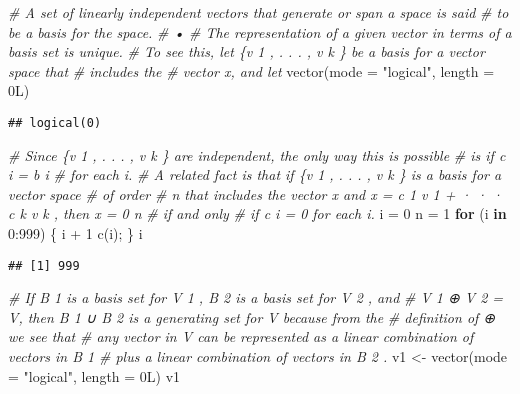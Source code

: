 \documentclass[
]{article}
\newenvironment{Shaded}{\begin{snugshade}}{\end{snugshade}}
\newcommand{\AttributeTok}[1]{\textcolor[rgb]{0.77,0.63,0.00}{#1}}
\newcommand{\CommentTok}[1]{\textcolor[rgb]{0.56,0.35,0.01}{\textit{#1}}}
\newcommand{\ControlFlowTok}[1]{\textcolor[rgb]{0.13,0.29,0.53}{\textbf{#1}}}
\newcommand{\DecValTok}[1]{\textcolor[rgb]{0.00,0.00,0.81}{#1}}
\newcommand{\FunctionTok}[1]{\textcolor[rgb]{0.00,0.00,0.00}{#1}}
\newcommand{\NormalTok}[1]{#1}
\newcommand{\OtherTok}[1]{\textcolor[rgb]{0.56,0.35,0.01}{#1}}
\newcommand{\SpecialCharTok}[1]{\textcolor[rgb]{0.00,0.00,0.00}{#1}}
\newcommand{\StringTok}[1]{\textcolor[rgb]{0.31,0.60,0.02}{#1}}
\begin{document}
\begin{Shaded}
\begin{Highlighting}[]
\CommentTok{\# A set of linearly independent vectors that generate or span a space is said}
\CommentTok{\# to be a basis for the space.}
\CommentTok{\# •}
\CommentTok{\# The representation of a given vector in terms of a basis set is unique.}
\CommentTok{\# To see this, let \{v 1 , . . . , v k \} be a basis for a vector space that }
\CommentTok{\# includes the}
\CommentTok{\# vector x, and let}
\FunctionTok{vector}\NormalTok{(}\AttributeTok{mode =} \StringTok{"logical"}\NormalTok{, }\AttributeTok{length =}\NormalTok{ 0L)}
\end{Highlighting}
\end{Shaded}

\begin{verbatim}
## logical(0)
\end{verbatim}

\begin{Shaded}
\begin{Highlighting}[]
\CommentTok{\# Since \{v 1 , . . . , v k \} are independent, the only way this is possible }
\CommentTok{\# is if c i = b i}
\CommentTok{\# for each i.}
\CommentTok{\# A related fact is that if \{v 1 , . . . , v k \} is a basis for a vector space }
\CommentTok{\# of order}
\CommentTok{\# n that includes the vector x and x = c 1 v 1 + · · · c k v k , then x = 0 n }
\CommentTok{\# if and only}
\CommentTok{\# if c i = 0 for each i.}
\NormalTok{i }\OtherTok{=} \DecValTok{0}
\NormalTok{n }\OtherTok{=} \DecValTok{1}
\ControlFlowTok{for}\NormalTok{ (i }\ControlFlowTok{in} \DecValTok{0}\SpecialCharTok{:}\DecValTok{999}\NormalTok{) \{}
\NormalTok{   i }\SpecialCharTok{+} \DecValTok{1}
   \FunctionTok{c}\NormalTok{(i);}
\NormalTok{\}}
\NormalTok{i }
\end{Highlighting}
\end{Shaded}

\begin{verbatim}
## [1] 999
\end{verbatim}

\begin{Shaded}
\begin{Highlighting}[]
\CommentTok{\# If B 1 is a basis set for V 1 , B 2 is a basis set for V 2 , and }
\CommentTok{\# V 1 ⊕ V 2 = V, then B 1 ∪ B 2 is a generating set for V because from the }
\CommentTok{\# deﬁnition of ⊕ we see that}
\CommentTok{\# any vector in V can be represented as a linear combination of vectors in B 1}
\CommentTok{\# plus a linear combination of vectors in B 2 .}
\NormalTok{v1 }\OtherTok{\textless{}{-}} \FunctionTok{vector}\NormalTok{(}\AttributeTok{mode =} \StringTok{"logical"}\NormalTok{, }\AttributeTok{length =}\NormalTok{ 0L)}
\NormalTok{v1}
\end{Highlighting}
\end{Shaded}
\end{document}
